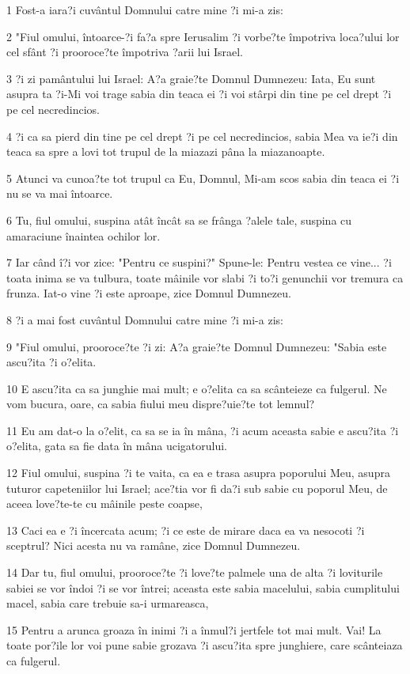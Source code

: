 \par 1 Fost-a iara?i cuvântul Domnului catre mine ?i mi-a zis:
\par 2 "Fiul omului, întoarce-?i fa?a spre Ierusalim ?i vorbe?te împotriva loca?ului lor cel sfânt ?i prooroce?te împotriva ?arii lui Israel.
\par 3 ?i zi pamântului lui Israel: A?a graie?te Domnul Dumnezeu: Iata, Eu sunt asupra ta ?i-Mi voi trage sabia din teaca ei ?i voi stârpi din tine pe cel drept ?i pe cel necredincios.
\par 4 ?i ca sa pierd din tine pe cel drept ?i pe cel necredincios, sabia Mea va ie?i din teaca sa spre a lovi tot trupul de la miazazi pâna la miazanoapte.
\par 5 Atunci va cunoa?te tot trupul ca Eu, Domnul, Mi-am scos sabia din teaca ei ?i nu se va mai întoarce.
\par 6 Tu, fiul omului, suspina atât încât sa se frânga ?alele tale, suspina cu amaraciune înaintea ochilor lor.
\par 7 Iar când î?i vor zice: "Pentru ce suspini?" Spune-le: Pentru vestea ce vine... ?i toata inima se va tulbura, toate mâinile vor slabi ?i to?i genunchii vor tremura ca frunza. Iat-o vine ?i este aproape, zice Domnul Dumnezeu.
\par 8 ?i a mai fost cuvântul Domnului catre mine ?i mi-a zis:
\par 9 "Fiul omului, prooroce?te ?i zi: A?a graie?te Domnul Dumnezeu: "Sabia este ascu?ita ?i o?elita.
\par 10 E ascu?ita ca sa junghie mai mult; e o?elita ca sa scânteieze ca fulgerul. Ne vom bucura, oare, ca sabia fiului meu dispre?uie?te tot lemnul?
\par 11 Eu am dat-o la o?elit, ca sa se ia în mâna, ?i acum aceasta sabie e ascu?ita ?i o?elita, gata sa fie data în mâna ucigatorului.
\par 12 Fiul omului, suspina ?i te vaita, ca ea e trasa asupra poporului Meu, asupra tuturor capeteniilor lui Israel; ace?tia vor fi da?i sub sabie cu poporul Meu, de aceea love?te-te cu mâinile peste coapse,
\par 13 Caci ea e ?i încercata acum; ?i ce este de mirare daca ea va nesocoti ?i sceptrul? Nici acesta nu va ramâne, zice Domnul Dumnezeu.
\par 14 Dar tu, fiul omului, prooroce?te ?i love?te palmele una de alta ?i loviturile sabiei se vor îndoi ?i se vor întrei; aceasta este sabia macelului, sabia cumplitului macel, sabia care trebuie sa-i urmareasca,
\par 15 Pentru a arunca groaza în inimi ?i a înmul?i jertfele tot mai mult. Vai! La toate por?ile lor voi pune sabie grozava ?i ascu?ita spre junghiere, care scânteiaza ca fulgerul.
